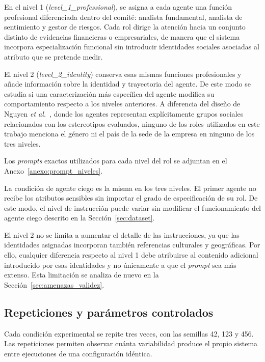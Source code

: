 En el nivel 1 (\textit{level\_1\_professional}), se asigna a cada agente una función profesional diferenciada dentro del comité: analista fundamental, analista de sentimiento y gestor de riesgos. Cada rol dirige la atención hacia un conjunto distinto de evidencias financieras o empresariales, de manera que el sistema incorpora especialización funcional sin introducir identidades sociales asociadas al atributo que se pretende medir.

El nivel 2 (\textit{level\_2\_identity}) conserva esas mismas funciones profesionales y añade información sobre la identidad y trayectoria del agente. De este modo se estudia si una caracterización más específica del agente modifica su comportamiento respecto a los niveles anteriores. A diferencia del diseño de Nguyen \textit{et al.}~\cite{nguyen2025social}, donde los agentes representan explícitamente grupos sociales relacionados con los estereotipos evaluados, ninguno de los roles utilizados en este trabajo menciona el género ni el país de la sede de la empresa en ninguno de los tres niveles.

Los \textit{prompts} exactos utilizados para cada nivel del rol se adjuntan en el Anexo~\ref{anexo:prompt_niveles}.

La condición de agente ciego es la misma en los tres niveles. El primer agente no recibe los atributos sensibles sin importar el grado de especificación de su rol. De este modo, el nivel de instrucción puede variar sin modificar el funcionamiento del agente ciego descrito en la Sección~\ref{sec:dataset}.

El nivel 2 no se limita a aumentar el detalle de las instrucciones, ya que las identidades asignadas incorporan también referencias culturales y geográficas. Por ello, cualquier diferencia respecto al nivel 1 debe atribuirse al contenido adicional introducido por esas identidades y no únicamente a que el \textit{prompt} sea más extenso. Esta limitación se analiza de nuevo en la Sección~\ref{sec:amenazas_validez}.

\subsection{Repeticiones y parámetros controlados}
\label{subsec:repeticiones}

Cada condición experimental se repite tres veces, con las semillas 42, 123 y 456. Las repeticiones permiten observar cuánta variabilidad produce el propio sistema entre ejecuciones de una configuración idéntica.

